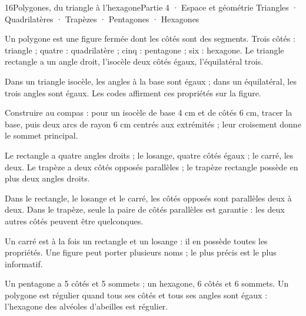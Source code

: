 \begin{ouverture}[geometrie]{16}{Polygones, du triangle à l’hexagone}{Partie 4 · Espace et géométrie}
{Triangles · Quadrilatères · Trapèzes · Pentagones · Hexagones}
\end{ouverture}
\pagestyle{otMain}\essentiel\fontsize{11}{15}\selectfont
{}\label{cours-16-1}
\begin{definition}Un polygone est une figure fermée dont les côtés sont des segments. Trois côtés : triangle ; quatre : quadrilatère ; cinq : pentagone ; six : hexagone. Le triangle rectangle a un angle droit, l’isocèle deux côtés égaux, l’équilatéral trois.\end{definition}
\label{fig-cours-16-1-cours-triangles}

\begin{propriete}Dans un triangle isocèle, les angles à la base sont égaux ; dans un équilatéral, les trois angles sont égaux. Les codes affirment ces propriétés sur la figure.\end{propriete}
\begin{savoirfaire}Construire au compas : pour un isocèle de base 4 cm et de côtés 6 cm, tracer la base, puis deux arcs de rayon 6 cm centrés aux extrémités ; leur croisement donne le sommet principal.\end{savoirfaire}
\clearpage
{}\label{cours-16-2}
\begin{definition}Le rectangle a quatre angles droits ; le losange, quatre côtés égaux ; le carré, les deux. Le trapèze a deux côtés opposés parallèles ; le trapèze rectangle possède en plus deux angles droits.\end{definition}
\label{fig-cours-16-2-cours-trapeze}

\begin{propriete}Dans le rectangle, le losange et le carré, les côtés opposés sont parallèles deux à deux. Dans le trapèze, seule la paire de côtés parallèles est garantie : les deux autres côtés peuvent être quelconques.\end{propriete}
\begin{attention}Un carré est à la fois un rectangle et un losange : il en possède toutes les propriétés. Une figure peut porter plusieurs noms ; le plus précis est le plus informatif.\end{attention}
\clearpage
{}\label{cours-16-3}
\begin{definition}Un pentagone a 5 côtés et 5 sommets ; un hexagone, 6 côtés et 6 sommets. Un polygone est régulier quand tous ses côtés et tous ses angles sont égaux : l’hexagone des alvéoles d’abeilles est régulier.\end{definition}
\label{fig-cours-16-3-cours-hexagone}

